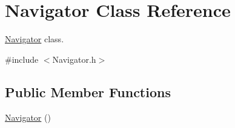 \hypertarget{classNavigator}{}\section{Navigator Class Reference}
\label{classNavigator}


\hyperlink{classNavigator}{Navigator} class.  




{\ttfamily \#include $<$Navigator.\+h$>$}

\subsection*{Public Member Functions}
\begin{DoxyCompactItemize}
\item 
\hyperlink{classNavigator_a59230ab4698882f754d5ce275a1a4030}{Navigator} ()\hypertarget{classNavigator_a59230ab4698882f754d5ce275a1a4030}{}\label{classNavigator_a59230ab4698882f754d5ce275a1a4030}


\end{DoxyCompactItemize}

